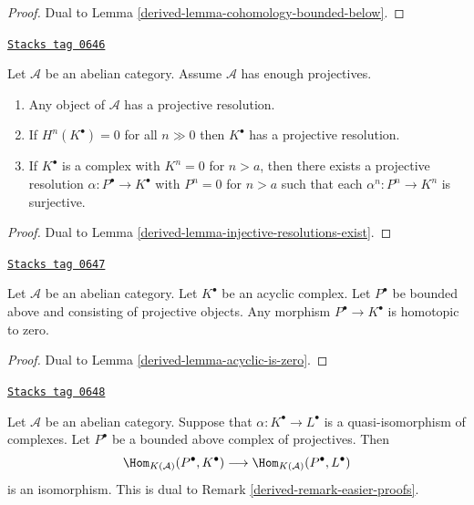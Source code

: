 \begin{proof}

Dual to
Lemma \ref{derived-lemma-cohomology-bounded-below}.
\end{proof}

\begin{lemma}
\label{derived-lemma-projective-resolutions-exist}
\href{https://stacks.math.columbia.edu/tag/0646}{\texttt{Stacks tag 0646}}

Let $\mathcal{A}$ be an abelian category.
Assume $\mathcal{A}$ has enough projectives.
\begin{enumerate}
\item Any object of $\mathcal{A}$ has a projective resolution.
\item If $H^n(K^\bullet) = 0$ for all $n \gg 0$ then
$K^\bullet$ has a projective resolution.
\item If $K^\bullet$ is a complex with $K^n = 0$ for $n > a$, then
there exists a projective resolution $\alpha : P^\bullet \to K^\bullet$
with $P^n = 0$ for $n > a$ such that each $\alpha^n : P^n \to K^n$ is
surjective.
\end{enumerate}
\end{lemma}

\begin{proof}

Dual to
Lemma \ref{derived-lemma-injective-resolutions-exist}.
\end{proof}

\begin{lemma}
\label{derived-lemma-projective-into-acyclic-is-zero}
\href{https://stacks.math.columbia.edu/tag/0647}{\texttt{Stacks tag 0647}}

Let $\mathcal{A}$ be an abelian category.
Let $K^\bullet$ be an acyclic complex.
Let $P^\bullet$ be bounded above and consisting of projective objects.
Any morphism $P^\bullet \to K^\bullet$ is homotopic to zero.
\end{lemma}

\begin{proof}

Dual to
Lemma \ref{derived-lemma-acyclic-is-zero}.
\end{proof}

\begin{remark}
\label{derived-remark-easier-projective}
\href{https://stacks.math.columbia.edu/tag/0648}{\texttt{Stacks tag 0648}}

Let $\mathcal{A}$ be an abelian category.
Suppose that $\alpha : K^\bullet \to L^\bullet$ is a quasi-isomorphism
of complexes. Let $P^\bullet$ be a bounded above complex of projectives.
Then
$$
\Hom_{K(\mathcal{A})}(P^\bullet, K^\bullet)
\longrightarrow
\Hom_{K(\mathcal{A})}(P^\bullet, L^\bullet)
$$
is an isomorphism. This is dual to
Remark \ref{derived-remark-easier-proofs}.
\end{remark}


